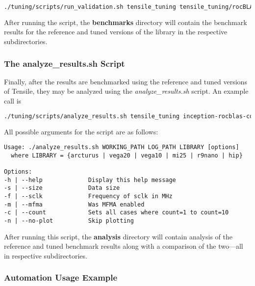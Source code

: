 \documentclass[]{article}
\begin{document}
\begin{lstlisting}[language=bash,breaklines=true]
./tuning/scripts/run_validation.sh tensile_tuning tensile_tuning/rocBLAS/
\end{lstlisting}

After running the script, the \textbf{benchmarks} directory will contain the benchmark results for the reference and tuned versions of the library in the respective subdirectories.

\subsubsection{The analyze\_results.sh Script}
\label{sec:analyse}

\noindent
Finally, after the results are benchmarked using the reference and tuned versions of Tensile, they may be analyzed using the \emph{analyze\_results.sh} script. An example call is

\begin{lstlisting}[language=bash,breaklines=true]
./tuning/scripts/analyze_results.sh tensile_tuning inception-rocblas-configs_unique.log vega20 -s 2 -f 1301
\end{lstlisting}

\noindent
All possible arguments for the script are as follows:

\begin{lstlisting}
Usage: ./analyze_results.sh WORKING_PATH LOG_PATH LIBRARY [options]
  where LIBRARY = {arcturus | vega20 | vega10 | mi25 | r9nano | hip}

Options:
-h | --help             Display this help message
-s | --size             Data size
-f | --sclk             Frequency of sclk in MHz
-m | --mfma             Was MFMA enabled
-c | --count            Sets all cases where count=1 to count=10
-n | --no-plot          Skip plotting
\end{lstlisting}

After running this script, the \textbf{analysis} directory will contain analysis of the reference and tuned benchmark results along with a comparison of the two---all in respective subdirectories.

\subsubsection{Automation Usage Example}
\end{document}
